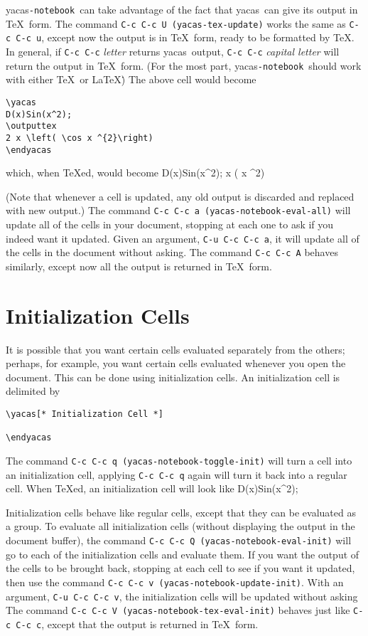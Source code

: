 \documentclass[12pt]{article}
\def\ys{\textsf{yacas}}
\def\yn{\textsf{yacas}\texttt{-notebook}}
\begin{document}
\yn\ can take advantage of the fact that \ys\ can give its output
in \TeX\ form.  The command \texttt{C-c C-c U (yacas-tex-update)}
works the same as \texttt{C-c C-c u}, except now the output is in
\TeX\ form, ready to be formatted by \TeX.  In general, if
\texttt{C-c C-c} \textsl{letter} returns \ys\ output, 
\texttt{C-c C-c} \textsl{capital letter} will return the output in
\TeX\ form.  (For the most part, \yn\ should work with either
\TeX\ or \LaTeX\.)  The above cell would become
\begin{verbatim}
\yacas
D(x)Sin(x^2);
\outputtex
2 x \left( \cos x ^{2}\right) 
\endyacas
\end{verbatim}
which, when \TeX{}ed, would become
\newpage
\yacas
D(x)Sin(x^2);
 x \left( \cos x ^{2}\right) 
\endyacas

(Note that whenever a cell is updated, any old output is discarded and
replaced with new output.)  The command \texttt{C-c C-c a
(yacas-notebook-eval-all)} will update all of the cells in your document,
stopping at each one to ask if you indeed want it updated.  Given an
argument, \texttt{C-u C-c C-c a}, it will update all of the cells in
the document without asking.  The command \texttt{C-c C-c A} behaves
similarly, except now all the output is returned in \TeX\ form.

\section{Initialization Cells}

It is possible that you want certain cells evaluated separately from
the others; perhaps, for example, you want certain cells evaluated
whenever you open the document.  This can be done using initialization
cells.  An initialization cell is delimited by
\begin{verbatim}
\yacas[* Initialization Cell *]

\endyacas
\end{verbatim}
The command \texttt{C-c C-c q (yacas-notebook-toggle-init)} will turn a cell
into an initialization cell, applying \texttt{C-c C-c q} again will
turn it back into a regular cell.  When \TeX{}ed, an initialization
cell will look like
D(x)Sin(x^2);
\endyacas

Initialization cells behave like regular cells, except that they can
be evaluated as a group.  To evaluate all initialization cells
(without displaying the output in the document buffer), the command
\texttt{C-c C-c Q (yacas-notebook-eval-init)} will go to each of the
initialization cells and evaluate them.  If you want the output of the
cells to be brought back, stopping at each cell to see if you want it
updated, then use the command \texttt{C-c C-c v
  (yacas-notebook-update-init)}.  With an argument, \texttt{C-u C-c C-c v},
the initialization cells will be updated without asking  The command
\texttt{C-c C-c V (yacas-notebook-tex-eval-init)} behaves just like
\texttt{C-c C-c c}, except that the output is returned in \TeX\ form.
\end{document}
